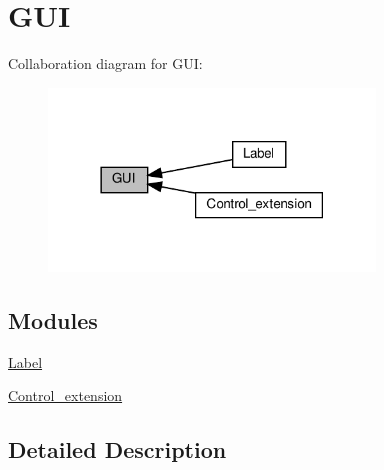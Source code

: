 \hypertarget{group__GUI}{}\section{G\+UI}
\label{group__GUI}
Collaboration diagram for G\+UI\+:
\nopagebreak
\begin{figure}[H]
\begin{center}
\leavevmode
\includegraphics[width=246pt]{group__GUI}
\end{center}
\end{figure}
\subsection*{Modules}
\begin{DoxyCompactItemize}
\item 
\hyperlink{group__label}{Label}
\item 
\hyperlink{group__control__extension}{Control\+\_\+extension}
\end{DoxyCompactItemize}


\subsection{Detailed Description}
